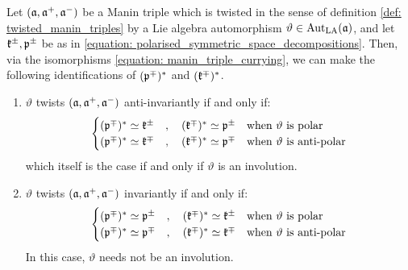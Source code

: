         \begin{lemma} \label{lemma: manin_triple_twists_and_duality}
            Let $(\mathfrak{a}, \mathfrak{a}^+, \mathfrak{a}^-)$ be a Manin triple which is twisted in the sense of definition \ref{def: twisted_manin_triples} by a Lie algebra automorphism $\vartheta \in \operatorname{Aut}_{\mathrm{LA}}(\mathfrak{a})$, and let $\mathfrak{k}^{\pm}, \mathfrak{p}^{\pm}$ be as in \eqref{equation: polarised_symmetric_space_decompositions}. Then, via the isomorphisms \eqref{equation: manin_triple_currying}, we can make the following identifications of $(\mathfrak{p}^{\mp})^*$ and $(\mathfrak{k}^{\mp})^*$.
            \begin{enumerate}
                \item $\vartheta$ twists $(\mathfrak{a}, \mathfrak{a}^+, \mathfrak{a}^-)$ anti-invariantly if and only if:
                    \begin{equation} \label{equation: anti_invariant_twist_duality}
                        \begin{cases}
                            (\mathfrak{p}^{\mp})^* \simeq \mathfrak{k}^{\pm} \quad, \quad (\mathfrak{k}^{\mp})^* \simeq \mathfrak{p}^{\pm} & \text{when $\vartheta$ is polar}
                            \\
                            (\mathfrak{p}^{\mp})^* \simeq \mathfrak{k}^{\mp} \quad, \quad (\mathfrak{k}^{\mp})^* \simeq \mathfrak{p}^{\mp} & \text{when $\vartheta$ is anti-polar}
                        \end{cases}
                    \end{equation}
                which itself is the case if and only if $\vartheta$ is an involution.
                \item $\vartheta$ twists $(\mathfrak{a}, \mathfrak{a}^+, \mathfrak{a}^-)$ invariantly if and only if:
                    \begin{equation} \label{equation: invariant_twist_duality}
                        \begin{cases}
                            (\mathfrak{p}^{\mp})^* \simeq \mathfrak{p}^{\pm} \quad, \quad (\mathfrak{k}^{\mp})^* \simeq \mathfrak{k}^{\pm} & \text{when $\vartheta$ is polar}
                            \\
                            (\mathfrak{p}^{\mp})^* \simeq \mathfrak{p}^{\mp} \quad, \quad (\mathfrak{k}^{\mp})^* \simeq \mathfrak{k}^{\mp} & \text{when $\vartheta$ is anti-polar}
                        \end{cases}
                    \end{equation}
                In this case, $\vartheta$ needs not be an involution.
            \end{enumerate}
        \end{lemma}
